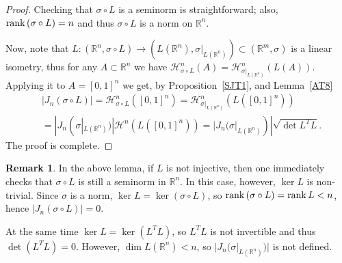 \documentclass[12pt,leqno]{amsart}
\theoremstyle{definition}
\newtheorem{remark}[theorem]{Remark}
\newcommand{\bbbr}{\mathbb R}
\def\H{{\mathcal H}}
\def\rank{{\rm rank\,}}
\numberwithin{theorem}{section} \numberwithin{equation}{section}
\begin{document}
\begin{proof}
Checking that $\sigma\circ L$ is a seminorm is straightforward; also, $\rank (\sigma\circ L)=n$ and thus $\sigma\circ L$ is a norm on $\bbbr^n$.

Now, note that $L:(\bbbr^n,\sigma\circ L)\to (L(\bbbr^n),\sigma|_{L(\bbbr^n)})\subset (\bbbr^m,\sigma)$ is a linear isometry, thus for any $A\subset \bbbr^n$ we have $\H^n_{\sigma\circ L}(A)=\H^n_{\sigma|_{L(\bbbr^n)}}(L(A))$. Applying it to $A=[0,1]^n$ we get, by Proposition~\ref{SJT1},
and Lemma~\ref{AT8}
\[
\begin{split}
&
|J_n(\sigma\circ L)|
=
\H^n_{\sigma\circ L}([0,1]^n)=\H^n_{\sigma|_{L(\bbbr^n)}}(L([0,1]^n))\\
&=
|J_n(\sigma|_{L(\bbbr^n)})|\H^n(L([0,1]^n))=|J_n(\sigma|_{L(\bbbr^n)})|\sqrt{\det L^TL}.
\end{split}
\]
The proof is complete.
%
\end{proof}

\begin{remark}
In the above lemma, if $L$ is not injective, then one immediately checks that $\sigma\circ L$ is still a seminorm in $\bbbr^n$.  In this case, however, $\ker L$ is non-trivial. Since $\sigma$ is a norm, $\ker L=\ker (\sigma\circ L)$, so $\rank (\sigma\circ L)=\rank L<n$, hence $|J_n(\sigma\circ L)|=0$.

At the same time $\ker L= \ker (L^T L)$, so $L^T L$ is not invertible and thus $\det(L^T L)=0$. However, $\dim L(\bbbr^n)<n$, so $|J_n(\sigma|_{L(\bbbr^n)})|$ is not defined.
\end{remark}
\end{document}
